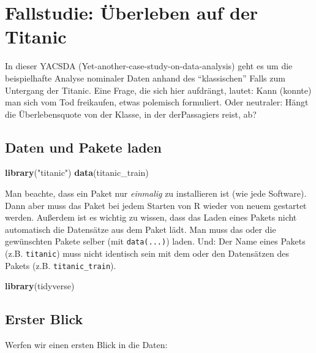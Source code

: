 \documentclass[12pt,]{book}
\makeatletter
\newenvironment{Shaded}{\begin{snugshade}}{\end{snugshade}}
\newcommand{\KeywordTok}[1]{\textcolor[rgb]{0.13,0.29,0.53}{\textbf{{#1}}}}
\newcommand{\StringTok}[1]{\textcolor[rgb]{0.31,0.60,0.02}{{#1}}}
\newcommand{\NormalTok}[1]{{#1}}
\newenvironment{kframe}{%
\medskip{}
\setlength{\fboxsep}{.8em}
 \def\at@end@of@kframe{}%
 \ifinner\ifhmode%
  \def\at@end@of@kframe{\end{minipage}}%
  \begin{minipage}{\columnwidth}%
 \fi\fi%
 \def\FrameCommand##1{\hskip\@totalleftmargin \hskip-\fboxsep
 \colorbox{shadecolor}{##1}\hskip-\fboxsep
     \hskip-\linewidth \hskip-\@totalleftmargin \hskip\columnwidth}%
 \MakeFramed {\advance\hsize-\width
   \@totalleftmargin\z@ \linewidth\hsize
   \@setminipage}}%
 {\par\unskip\endMakeFramed%
 \at@end@of@kframe}
\renewenvironment{Shaded}{\begin{kframe}}{\end{kframe}}
\makeatother
\begin{document}
\section{Fallstudie: Überleben auf der
Titanic}\label{fallstudie-uberleben-auf-der-titanic}

In dieser YACSDA (Yet-another-case-study-on-data-analysis) geht es um
die beispielhafte Analyse nominaler Daten anhand des ``klassischen''
Falls zum Untergang der Titanic. Eine Frage, die sich hier aufdrängt,
lautet: Kann (konnte) man sich vom Tod freikaufen, etwas polemisch
formuliert. Oder neutraler: Hängt die Überlebensquote von der Klasse, in
der derPassagiers reist, ab?

\subsection{Daten und Pakete laden}\label{daten-und-pakete-laden}

\begin{Shaded}
\begin{Highlighting}[]
\KeywordTok{library}\NormalTok{(}\StringTok{"titanic"}\NormalTok{)}
\KeywordTok{data}\NormalTok{(titanic_train)}
\end{Highlighting}
\end{Shaded}

Man beachte, dass ein Paket nur \emph{einmalig} zu installieren ist (wie
jede Software). Dann aber muss das Paket bei jedem Starten von R wieder
von neuem gestartet werden. Außerdem ist es wichtig zu wissen, dass das
Laden eines Pakets nicht automatisch die Datensätze aus dem Paket lädt.
Man muss das oder die gewünschten Pakete selber (mit \texttt{data(...)})
laden. Und: Der Name eines Pakets (z.B. \texttt{titanic}) muss nicht
identisch sein mit dem oder den Datensätzen des Pakets (z.B.
\texttt{titanic\_train}).

\begin{Shaded}
\begin{Highlighting}[]
\KeywordTok{library}\NormalTok{(tidyverse)}
\end{Highlighting}
\end{Shaded}

\subsection{Erster Blick}\label{erster-blick}

Werfen wir einen ersten Blick in die Daten:
\end{document}
